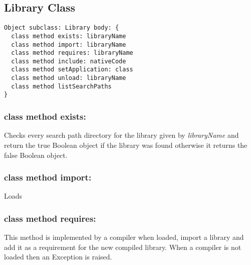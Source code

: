 \subsection{Library Class}

\begin{lstlisting}
Object subclass: Library body: {
  class method exists: libraryName
  class method import: libraryName
  class method requires: libraryName
  class method include: nativeCode
  class method setApplication: class
  class method unload: libraryName
  class method listSearchPaths
}
\end{lstlisting}

\subsubsection{class method exists:}
Checks every search path directory for the library given by \textit{libraryName} and return the true Boolean object if the library was found otherwise it returns the false Boolean object.

\subsubsection{class method import:}
Loads 

\subsubsection{class method requires:}
This method is implemented by a compiler when loaded, import a library and add it as a requirement for the new compiled library. When a compiler is not loaded then an Exception is raised.